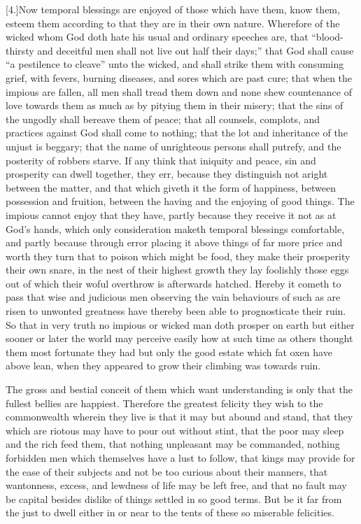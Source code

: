 [4.]Now temporal blessings are enjoyed of those which have them, know them, esteem them according to that they are in their own nature. Wherefore of the wicked whom God doth hate his usual and ordinary speeches are, that “blood-thirsty and deceitful men shall not live out half their days;” that God shall cause “a pestilence to cleave” unto the wicked, and shall strike them with consuming grief, with fevers, burning diseases, and sores which are past cure; that when the impious are fallen, all men shall tread them down  and none shew countenance of love towards them as much as by pitying them in their misery; that the sins of the ungodly shall bereave them of peace; that all counsels, complots, and practices against God shall come to nothing; that the lot and inheritance of the unjust is beggary; that the name of unrighteous persons shall putrefy, and the posterity of robbers starve. If any think that iniquity and peace, sin and prosperity can dwell together, they err, because they distinguish not aright between the matter, and that which giveth it the form of happiness, between possession and fruition, between the having and the enjoying of good things. The impious cannot enjoy that they have, partly because they receive it not as at God’s hands, which only consideration maketh temporal blessings comfortable, and partly because through error placing it above things of far more price and worth they turn that to poison which might be food, they make their prosperity their own snare, in the nest of their highest growth they lay foolishly those eggs out of which their woful overthrow is afterwards hatched. Hereby it cometh to pass that wise and judicious men observing the vain behaviours of such as are risen to unwonted greatness have thereby been able to prognosticate their ruin. So that in very truth no impious or wicked man doth prosper on earth but either sooner or later the world may perceive easily how at such time as others thought them most fortunate they had but only the good estate which fat oxen have above lean, when they appeared to grow their climbing was towards ruin.

The gross and bestial conceit of them which want understanding is only that the fullest bellies are happiest. Therefore  the greatest felicity they wish to the commonwealth wherein they live is that it may but abound and stand,
 that they which are riotous may have to pour out without stint, that the poor may sleep and the rich feed them, that nothing unpleasant may be commanded, nothing forbidden men which themselves have a lust to follow, that kings may provide for the ease of their subjects and not be too curious about their manners, that wantonness, excess, and lewdness of life may be left free, and that no fault may be capital besides dislike of things settled in so good terms. But be it far from the just to dwell either in or near to the tents of these so miserable felicities.

